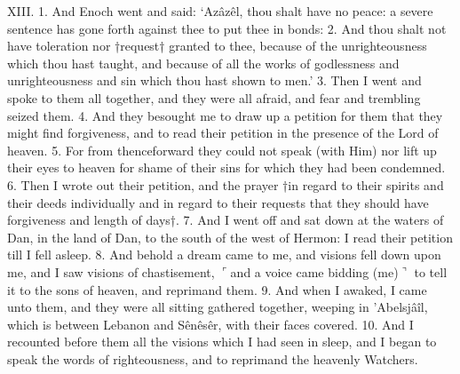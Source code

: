 XIII. 1. And Enoch went and said: ‘Azâzêl,
thou shalt have no peace: a severe sentence has gone
forth against thee to put thee in bonds: 2. And
thou shalt not have toleration nor †request† granted
to thee, because of the unrighteousness which thou
hast taught, and because of all the works of godlessness
and unrighteousness and sin which thou hast
shown to men.’ 3. Then I went and spoke to them
all together, and they were all afraid, and fear and
trembling seized them. 4. And they besought me
to draw up a petition for them that they might find
forgiveness, and to read their petition in the presence
of the Lord of heaven. 5. For from thenceforward
they could not speak (with Him) nor lift up their
eyes to heaven for shame of their sins for which they
had been condemned. 6. Then I wrote out their
petition, and the prayer †in regard to their spirits
and their deeds individually and in regard to their
requests that they should have forgiveness and length
of days†. 7. And I went off and sat down at the
waters of Dan, in the land of Dan, to the south of the
west of Hermon: I read their petition till I fell
asleep. 8. And behold a dream came to me, and
visions fell down upon me, and I saw visions of
chastisement, $\ulcorner$and a voice came bidding (me)$\urcorner$ to
tell it to the sons of heaven, and reprimand them.
9. And when I awaked, I came unto them, and
they were all sitting gathered together, weeping in
’Abelsjâîl, which is between Lebanon and Sênêsêr,
with their faces covered. 10. And I recounted before
them all the visions which I had seen in sleep, and I
began to speak the words of righteousness, and to
reprimand the heavenly Watchers.

